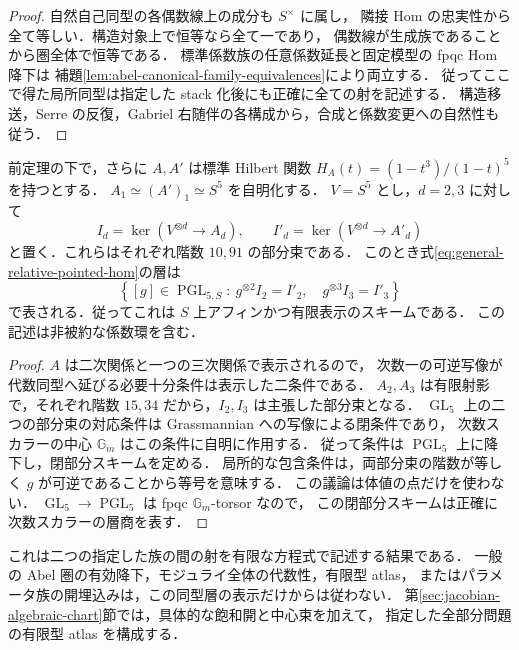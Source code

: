 \begin{proof}
自然自己同型の各偶数線上の成分も $S^\times$ に属し，
隣接 Hom の忠実性から全て等しい．構造対象上で恒等なら全て一であり，
偶数線が生成族であることから圏全体で恒等である．
標準係数族の任意係数延長と固定模型の fpqc Hom 降下は
補題\ref{lem:abel-canonical-family-equivalences}により両立する．
従ってここで得た局所同型は指定した stack 化後にも正確に全ての射を記述する．
構造移送，Serre の反復，Gabriel 右随伴の各構成から，合成と係数変更への自然性も従う．
\end{proof}

\begin{corollary}[同型層の有限な方程式]
\label{cor:general-relative-isom-scheme}
前定理の下で，さらに $A,A'$ は標準 Hilbert 関数
$H_A(t)=(1-t^3)/(1-t)^5$ を持つとする．
$A_1\simeq(A')_1\simeq S^5$ を自明化する．
$V=S^5$ とし，$d=2,3$ に対して
\[
 I_d=\ker(V^{\otimes d}\to A_d),\qquad
 I'_d=\ker(V^{\otimes d}\to A'_d)
\]
と置く．これらはそれぞれ階数 $10,91$ の部分束である．
このとき式\eqref{eq:general-relative-pointed-hom}の層は
\begin{equation}\label{eq:general-finite-isom-equations}
 \left\{[g]\in\operatorname{PGL}_{5,S}:\
    g^{\otimes2}I_2=I'_2,\quad g^{\otimes3}I_3=I'_3\right\}
\end{equation}
で表される．従ってこれは $S$ 上アフィンかつ有限表示のスキームである．
この記述は非被約な係数環を含む．
\end{corollary}

\begin{proof}
$A$ は二次関係と一つの三次関係で表示されるので，
次数一の可逆写像が代数同型へ延びる必要十分条件は表示した二条件である．
$A_2,A_3$ は有限射影で，それぞれ階数 $15,34$ だから，$I_2,I_3$ は主張した部分束となる．
$\operatorname{GL}_5$ 上の二つの部分束の対応条件は Grassmannian への写像による閉条件であり，
次数スカラーの中心 $\mathbb G_m$ はこの条件に自明に作用する．
従って条件は $\operatorname{PGL}_5$ 上に降下し，閉部分スキームを定める．
局所的な包含条件は，両部分束の階数が等しく $g$ が可逆であることから等号を意味する．
この議論は体値の点だけを使わない．
$\operatorname{GL}_5\to\operatorname{PGL}_5$ は fpqc $\mathbb G_m$-torsor なので，
この閉部分スキームは正確に次数スカラーの層商を表す．
\end{proof}

これは二つの指定した族の間の射を有限な方程式で記述する結果である．
一般の Abel 圏の有効降下，モジュライ全体の代数性，有限型 atlas，
またはパラメータ族の開埋込みは，この同型層の表示だけからは従わない．
第\ref{sec:jacobian-algebraic-chart}節では，具体的な飽和開と中心束を加えて，
指定した全部分問題の有限型 atlas を構成する．


